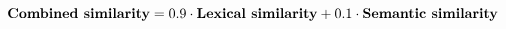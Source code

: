\begin{equation}
  \text{\textbf{Combined similarity}} =
    0.9\cdot\text{\textbf{Lexical similarity}} +
    0.1\cdot\text{\textbf{Semantic similarity}}
\end{equation}
